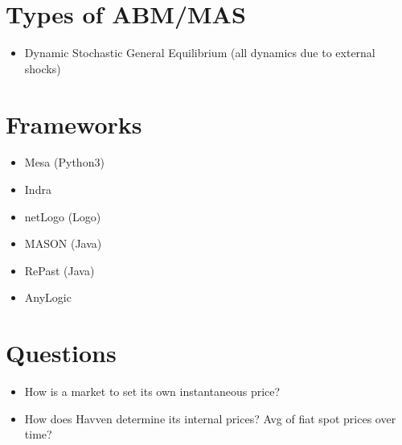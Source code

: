 \documentclass{article}
\begin{document}
\section{Types of ABM/MAS}
\begin{itemize}
    \item Dynamic Stochastic General Equilibrium (all dynamics due to external shocks)
\end{itemize}

\section{Frameworks}

\begin{itemize}
    \item Mesa (Python3)
    \item Indra
    \item netLogo (Logo)
    \item MASON (Java)
    \item RePast (Java)
    \item AnyLogic
\end{itemize}

\section{Questions}

\begin{itemize}
    \item How is a market to set its own instantaneous price?
    \item How does Havven determine its internal prices? Avg of fiat spot prices over time?
\end{itemize}
\end{document}
